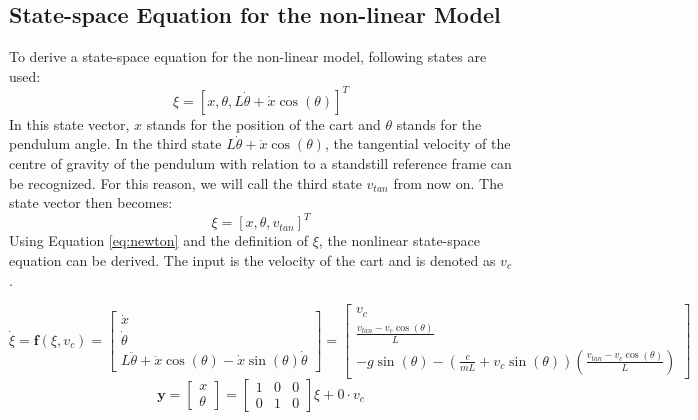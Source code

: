 \documentclass[a4paper,kul]{kulakarticle} %
\begin{document}
\begin{figure}[htp!]
\begin{minipage}{.5\textwidth}
		\label{fig:VLDpendulum}
	\end{minipage}
\end{figure}


\subsection{State-space Equation for the non-linear Model}
To derive a state-space equation for the non-linear model, following states are used:
\begin{equation}
	\xi = [x, \theta, L\dot{\theta} +  \dot{x}\cos(\theta)]^{T}
\end{equation}
In this state vector, $x$ stands for the position of the cart and $\theta$ stands for the pendulum angle. In the third state $L\dot{\theta} +  \dot{x}\cos(\theta)$, the tangential velocity of the centre of gravity of the pendulum with relation to a standstill reference frame can be recognized. For this reason, we will call the third state $v_{tan}$ from now on. The state vector then becomes: 
\begin{equation}
\xi = [x, \theta, v_{tan}]^{T}
\label{eq:xi}
\end{equation}
Using Equation \ref{eq:newton} and the definition of $\xi$, the nonlinear state-space equation can be derived. The input is the velocity of the cart and is denoted as $v_{c}$. 

\begin{equation}
	\dot{\xi} = \mathbf{f}(\xi,v_c) = \begin{bmatrix}
	\dot{x} \\ \dot{\theta} \\ L\ddot{\theta} + \ddot{x}\cos(\theta) - \dot{x}\sin(\theta)\dot{\theta}
	\end{bmatrix} = \begin{bmatrix}
	v_c \\ \frac{v_{tan}-v_c\cos(\theta)}{L} \\ -g\sin(\theta) - (\frac{c}{mL}+v_c\sin(\theta))(\frac{v_{tan} - v_c\cos(\theta)}{L})
	\end{bmatrix}
	\label{eq:nonlinear}
	\end{equation}
	\begin{equation}
	\mathbf{y} 
 = \begin{bmatrix}
	 x\\\theta
 \end{bmatrix} = \begin{bmatrix}
 1&0&0\\0&1&0
 \end{bmatrix}\xi + 0 \cdot v_c
 \label{eq:measurementnonlinear}
 \end{equation}
\end{document}
